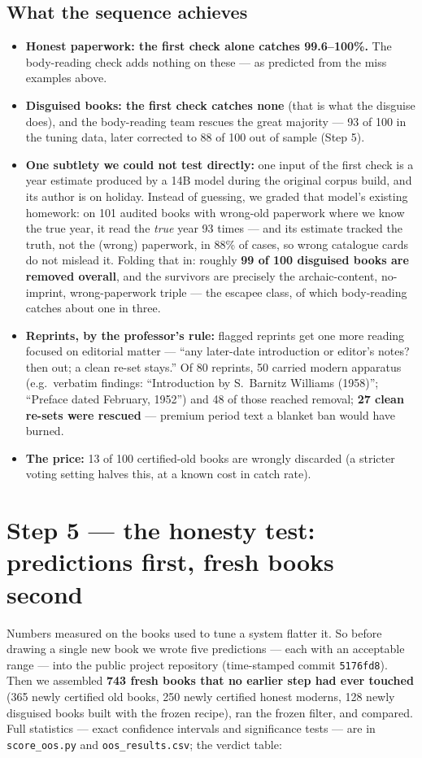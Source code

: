 \documentclass[11pt]{article}
\begin{document}
\subsection{What the sequence achieves}
\begin{itemize}[leftmargin=1.4em,itemsep=2pt]
\item \textbf{Honest paperwork: the first check alone catches 99.6--100\%.} The body-reading check adds
      nothing on these --- as predicted from the miss examples above.
\item \textbf{Disguised books: the first check catches none} (that is what the disguise does), and the
      body-reading team rescues the great majority --- 93 of 100 in the tuning data, later corrected to
      88 of 100 out of sample (Step 5).
\item \textbf{One subtlety we could not test directly:} one input of the first check is a year estimate
      produced by a 14B model during the original corpus build, and its author is on holiday. Instead
      of guessing, we graded that model's existing homework: on 101 audited books with wrong-old
      paperwork where we know the true year, it read the \emph{true} year 93 times --- and its estimate
      tracked the truth, not the (wrong) paperwork, in 88\% of cases, so wrong catalogue cards do not
      mislead it. Folding that in: roughly \textbf{99 of 100 disguised books are removed overall}, and
      the survivors are precisely the archaic-content, no-imprint, wrong-paperwork triple --- the
      escapee class, of which body-reading catches about one in three.
\item \textbf{Reprints, by the professor's rule:} flagged reprints get one more reading focused on
      editorial matter --- ``any later-date introduction or editor's notes? then out; a clean re-set
      stays.'' Of 80 reprints, 50 carried modern apparatus (e.g.\ verbatim findings:
      ``Introduction by S.~Barnitz Williams (1958)''; ``Preface dated February, 1952'') and 48 of those
      reached removal; \textbf{27 clean re-sets were rescued} --- premium period text a blanket ban
      would have burned.
\item \textbf{The price:} 13 of 100 certified-old books are wrongly discarded (a stricter voting
      setting halves this, at a known cost in catch rate).
\end{itemize}

\section{Step 5 --- the honesty test: predictions first, fresh books second}
Numbers measured on the books used to tune a system flatter it. So before drawing a single new book we
wrote five predictions --- each with an acceptable range --- into the public project repository
(time-stamped commit \texttt{5176fd8}). Then we assembled \textbf{743 fresh books that no earlier step
had ever touched} (365 newly certified old books, 250 newly certified honest moderns, 128 newly
disguised books built with the frozen recipe), ran the frozen filter, and compared. Full statistics
--- exact confidence intervals and significance tests --- are in \texttt{score\_oos.py} and
\texttt{oos\_results.csv}; the verdict table:
\end{document}
